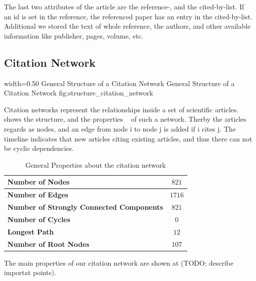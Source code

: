 The last two attributes of the article are the reference-, and the cited-by-list. If an id is set in the reference, the referenced paper has an entry in the cited-by-list. Additional we stored the text of whole reference, the authors, and other available information like publisher, pages, volume, etc.

\subsection{Citation Network}
\label{sec:citation_network}

      {width=0.50\textwidth}
      {General Structure of a Citation Network}
      {General Structure of a Citation Network}
      {fig:structure_citation_network}

Citation networks represent the relationships inside a set of scientific articles.  shows the structure, and the properties ~\cite{kas2011} of such a network. Therby the articles regards as nodes, and an edge from node i to node j is added if i cites j. The timeline indicates that new articles citing existing articles, and thus there can not be cyclic dependencies.

\begin{table}
  \centering
  \begin{tabular}{ l c }
    \toprule
    \textbf{Number of Nodes}      & $821$  \\ \midrule
    \textbf{Number of Edges}      & $1716$ \\ \midrule
    \textbf{Number of Strongly Connected Components} & $821$    \\ \midrule
    \textbf{Number of Cycles}     & $0$    \\ \midrule
    \textbf{Longest Path}         & $12$   \\ \midrule
    \textbf{Number of Root Nodes} & $107$  \\
    \bottomrule
  \end{tabular}
  \caption[General Properties about the citation network]{General Properties about the citation network}
  \label{tbl:general_properties_about_the_graph}
\end{table}

The main properties of our citation network are shown at (TODO: describe importat points).


